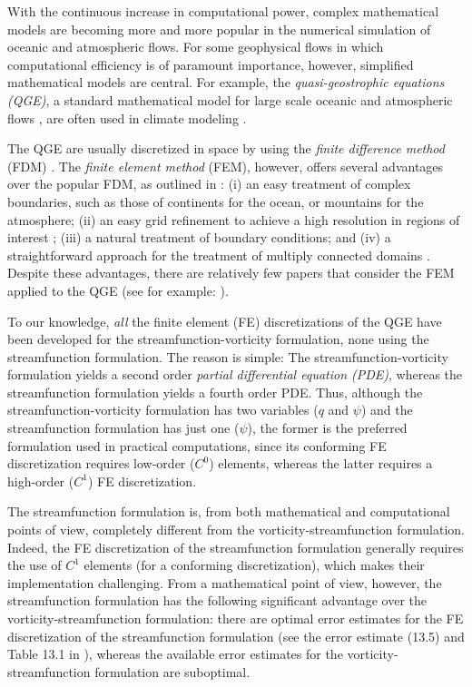 With the continuous increase in computational power, complex mathematical models
are becoming more and more popular in the numerical simulation of oceanic and
atmospheric flows. For some geophysical flows in which computational efficiency
is of paramount importance, however, simplified mathematical models are central.
For example, the \emph{quasi-geostrophic equations (QGE)}, a standard
mathematical model for large scale oceanic and atmospheric flows
\cite{Cushman11,Majda,Pedlosky92,Vallis06}, are often used in climate modeling
\cite{Dijkstra05}.

The QGE are usually discretized in space by using the \emph{finite difference
method} (FDM) \cite{San11}. The \emph{finite element method} (FEM), however,
offers several advantages over the popular FDM, as outlined in \cite{Myers}: (i)
an easy treatment of complex boundaries, such as those of continents for the
ocean, or mountains for the atmosphere; (ii) an easy grid refinement to achieve
a high resolution in regions of interest \cite{Cascon}; (iii) a natural
treatment of boundary conditions; and (iv) a straightforward approach for the
treatment of multiply connected domains \cite{Myers}. Despite these advantages,
there are relatively few papers that consider the FEM applied to the QGE (see
for example: \cite{Cascon, Fix, LeProvost94, Myers, Stevens82}).

To our knowledge, \emph{all} the finite element (FE) discretizations of the QGE
have been developed for the streamfunction-vorticity formulation, none using the
streamfunction formulation. The reason is simple: The streamfunction-vorticity
formulation yields a second order \emph{partial differential equation (PDE)},
whereas the streamfunction formulation yields a fourth order PDE. Thus, although
the streamfunction-vorticity formulation has two variables ($q$ and $\psi$) and
the streamfunction formulation has just one ($\psi$), the former is the
preferred formulation used in practical computations, since its conforming FE
discretization requires low-order ($C^0$) elements, whereas the latter requires
a high-order ($C^1$) FE discretization.

The streamfunction formulation is, from both mathematical and computational
points of view, completely different from the vorticity-streamfunction
formulation. Indeed, the FE discretization of the streamfunction formulation
generally requires the use of $C^1$ elements (for a conforming discretization),
which makes their implementation challenging. From a mathematical point of view,
however, the streamfunction formulation has the following significant advantage
over the vorticity-streamfunction formulation: there are optimal error estimates
for the FE discretization of the streamfunction formulation (see the error
estimate (13.5) and Table 13.1 in \cite{Gunzburger89}), whereas the available
error estimates for the vorticity-streamfunction formulation are suboptimal.

